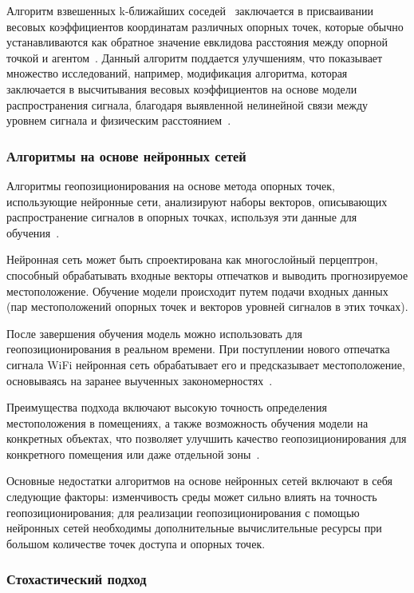 Алгоритм взвешенных k-ближайших соседей~\cite{gansemer2010improved} заключается в присваивании весовых коэффициентов координатам различных опорных точек, которые обычно устанавливаются как обратное значение евклидова расстояния между опорной точкой и агентом~\cite{wknn}. Данный алгоритм поддается улучшениям, что показывает множество исследований, например, модификация алгоритма, которая заключается в высчитывания весовых коэффициентов на основе модели распространения сигнала, благодаря выявленной нелинейной связи между уровнем сигнала и физическим расстоянием~\cite{mwknn}.

\subsubsection{Алгоритмы на основе нейронных сетей}

Алгоритмы геопозиционирования на основе метода опорных точек, использующие нейронные сети, анализируют наборы векторов, описывающих распространение сигналов в опорных точках, используя эти данные для обучения~\cite{neural-networks}. 

Нейронная сеть может быть спроектирована как многослойный перцептрон, способный обрабатывать входные векторы отпечатков и выводить прогнозируемое местоположение. Обучение модели происходит путем подачи входных данных (пар местоположений опорных точек и векторов уровней сигналов в этих точках).

После завершения обучения модель можно использовать для геопозиционирования в реальном времени. При поступлении нового отпечатка сигнала WiFi нейронная сеть обрабатывает его и предсказывает местоположение, основываясь на заранее выученных закономерностях~\cite{trends}.

Преимущества подхода включают высокую точность определения местоположения в помещениях, а также возможность обучения модели на конкретных объектах, что позволяет улучшить качество геопозиционирования для конкретного помещения или даже отдельной зоны~\cite{neural-networks}.

Основные недостатки алгоритмов на основе нейронных сетей включают в себя следующие факторы: изменчивость среды может сильно влиять на точность геопозиционирования; для реализации геопозиционирования с помощью нейронных сетей необходимы дополнительные вычислительные ресурсы при большом количестве точек доступа и опорных точек.

\subsubsection{Стохастический подход}

